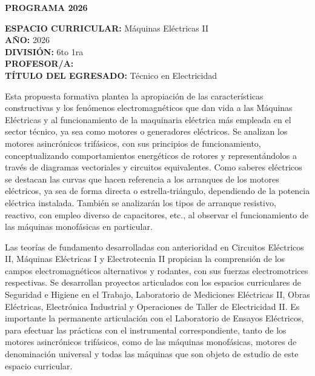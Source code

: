 \documentclass[a4paper,12pt]{article}
\begin{document}
\begin{center}
    \fontsize{14pt}{16pt}\selectfont \textbf{\uppercase{Programa 2026}}
\end{center}

\vspace{0.3cm}

\raggedright
\textbf{ESPACIO CURRICULAR:} Máquinas Eléctricas II \\
\textbf{AÑO:} 2026 \\
\textbf{DIVISIÓN:} 6to 1ra \\
\textbf{PROFESOR/A:} \profesor \\
\textbf{TÍTULO DEL EGRESADO:} Técnico en Electricidad

\vspace{0.5cm}

\fontsize{12pt}{14pt}\selectfont
Esta propuesta formativa plantea la apropiación de las características constructivas y los fenómenos electromagnéticos que dan vida a las Máquinas Eléctricas y al funcionamiento de la maquinaria eléctrica más empleada en el sector técnico, ya sea como motores o generadores eléctricos. Se analizan los motores asincrónicos trifásicos, con sus principios de funcionamiento, conceptualizando comportamientos energéticos de rotores y representándolos a través de diagramas vectoriales y circuitos equivalentes. Como saberes eléctricos se destacan las curvas que hacen referencia a los arranques de los motores eléctricos, ya sea de forma directa o estrella-triángulo, dependiendo de la potencia eléctrica instalada. También se analizarán los tipos de arranque resistivo, reactivo, con empleo diverso de capacitores, etc., al observar el funcionamiento de las máquinas monofásicas en particular.

Las teorías de fundamento desarrolladas con anterioridad en Circuitos Eléctricos II, Máquinas Eléctricas I y Electrotecnia II propician la comprensión de los campos electromagnéticos alternativos y rodantes, con sus fuerzas electromotrices respectivas. Se desarrollan proyectos articulados con los espacios curriculares de Seguridad e Higiene en el Trabajo, Laboratorio de Mediciones Eléctricas II, Obras Eléctricas, Electrónica Industrial y Operaciones de Taller de Electricidad II. Es importante la permanente articulación con el Laboratorio de Ensayos Eléctricos, para efectuar las prácticas con el instrumental correspondiente, tanto de los motores asincrónicos trifásicos, como de las máquinas monofásicas, motores de denominación universal y todas las máquinas que son objeto de estudio de este espacio curricular.
\end{document}

